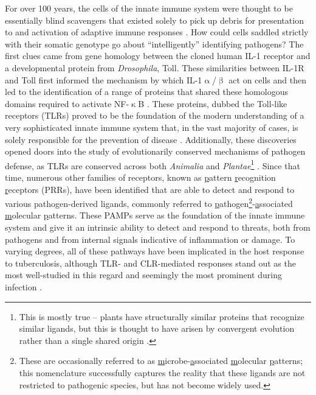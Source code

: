 For over 100 years, the cells of the innate immune system were thought to be essentially blind scavengers that existed solely to pick up debris for presentation to and activation of adaptive immune responses \citep{Iwasaki2010}. How could cells saddled strictly with their somatic genotype go about ``intelligently'' identifying pathogens? The first clues came from gene homology between the cloned human IL\hyp{}1 receptor and a developmental protein from \textit{Drosophila}, Toll. These similarities between IL\hyp{}1R and Toll first informed the mechanism by which IL\hyp{}1$\upalpha$/$\upbeta$ act on cells and then led to the identification of a range of proteins that shared these homologous domains required to activate NF\hyp{}$\upkappa$B \citep{ONeill2013, Rock1998}. These proteins, dubbed the Toll\hyp{}like receptors (TLRs) proved to be the foundation of the modern understanding of a very sophisticated innate immune system that, in the vast majority of cases, is solely responsible for the prevention of disease \citep{Janeway2005}. Additionally, these discoveries opened doors into the study of evolutionarily conserved mechanisms of pathogen defense, as TLRs are conserved across both \textit{Animalia} and \textit{Plantae}\footnote{This is mostly true -- plants have structurally similar proteins that recognize similar ligands, but this is thought to have arisen by convergent evolution rather than a single shared origin \citep{Johnson2003b}.} \citep{Armant2002, Ausubel2005}. Since that time, numerous other families of receptors, known as \underline{p}attern \underline{r}ecognition \underline{r}eceptors (PRRs), have been identified that are able to detect and respond to various pathogen\hyp{}derived ligands, commonly referred to \underline{p}athogen\footnote{These are occasionally referred to as \underline{m}icrobe\hyp{}\underline{a}ssociated \underline{m}olecular \underline{p}atterns; this nomenclature successfully captures the reality that these ligands are not restricted to pathogenic species, but has not become widely used.}\hyp{}\underline{a}ssociated \underline{m}olecular \underline{p}atterns. These PAMPs serve as the foundation of the innate immune system and give it an intrinsic ability to detect and respond to threats, both from pathogens and from internal signals indicative of inflammation or damage. To varying degrees, all of these pathways have been implicated in the host response to tuberculosis, although TLR\hyp{} and CLR\hyp{}mediated responses stand out as the most well\hyp{}studied in this regard and seemingly the most prominent during infection \citep{Stamm2015}.

